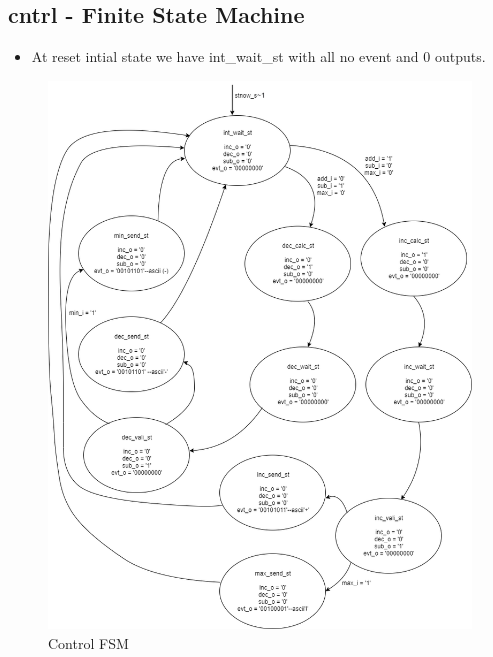 \documentclass[12pt,a4 paper] {report}
\begin{document}
\newpage

\subsection*{cntrl - Finite State Machine}

\begin{itemize}
\item At reset intial state we have int\_wait\_st with all no event and 0 outputs.  
	
	
\end{itemize}
\begin{figure}[h]
	\centering	
	\includegraphics[scale=0.3]{../png/Control.png}
	\caption{Control FSM}
\end{figure}
\end{document}
